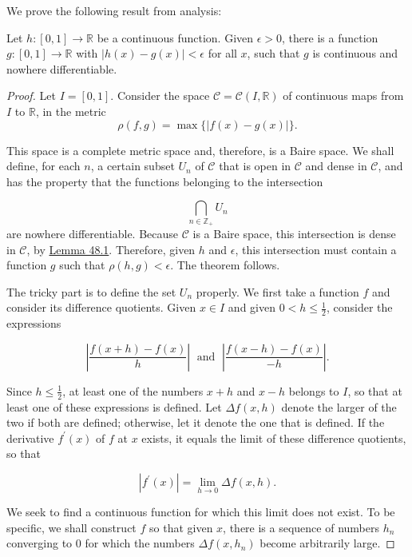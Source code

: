 We prove the following result from analysis:

\begin{theorem}
\label{thm:\thetheorem}
Let \(h : [ {0,1}] \rightarrow \mathbb{R}\) be a continuous function. Given \(\epsilon > 0\), there is a function \(g : [ {0,1}] \rightarrow \mathbb{R}\) with \(| {h(x) - g(x) }| < \epsilon\) for all \(x\), such that \(g\) is continuous and nowhere differentiable.
\end{theorem}

\begin{proof}
Let \(I = [ {0,1}]\). Consider the space \(\mathcal{C} = \mathcal{C}({I,\mathbb{R}})\) of continuous maps from \(I\) to \(\mathbb{R}\), in the metric
\[
\rho ({f,g}) = \max \{ | {f(x) - g(x) }| \}.
\]

This space is a complete metric space and, therefore, is a Baire space. We shall define, for each \(n\), a certain subset \(U_{n}\) of \(\mathcal{C}\) that is open in \(\mathcal{C}\) and dense in \(\mathcal{C}\), and has the property that the functions belonging to the intersection

\[
\mathop{\bigcap }\limits_{{n \in {\mathbb{Z}}_{ + }}}U_{n}
\]
are nowhere differentiable. Because \(\mathcal{C}\) is a Baire space, this intersection is dense in \(\mathcal{C}\), by \hyperref[lem:48.1]{Lemma 48.1}. Therefore, given \(h\) and \(\epsilon\), this intersection must contain a function \(g\) such that \(\rho ({h,g}) < \epsilon\). The theorem follows.

The tricky part is to define the set \(U_{n}\) properly. We first take a function \(f\) and consider its difference quotients. Given \(x \in I\) and given \(0 < h \leq \frac{1}{2}\), consider the expressions

\[
| \frac{f({x + h}) - f(x) }{h}| \;\text{ and }\;| \frac{f({x - h}) - f(x) }{-h}| .
\]

Since \(h \leq \frac{1}{2}\), at least one of the numbers \(x + h\) and \(x - h\) belongs to \(I\), so that at least one of these expressions is defined. Let \({\Delta f}({x,h})\) denote the larger of the two if both are defined; otherwise, let it denote the one that is defined. If the derivative \(f^{\prime }(x)\) of \(f\) at \(x\) exists, it equals the limit of these difference quotients, so that

\[
| {f^{\prime }(x) }| = \mathop{\lim }\limits_{{h \rightarrow 0}}{\Delta f}({x,h}).
\]

We seek to find a continuous function for which this limit does not exist. To be specific, we shall construct \(f\) so that given \(x\), there is a sequence of numbers \(h_{n}\) converging to 0 for which the numbers \({\Delta f}({x,h_{n}})\) become arbitrarily large.


\end{proof}
